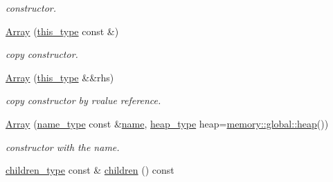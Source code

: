 \begin{DoxyCompactItemize}
\begin{DoxyCompactList}\small\item\em constructor. \end{DoxyCompactList}\item 
\hypertarget{classhryky_1_1reduction_1_1_array_aeb59dfb859e8cec1dd251bfa249c42dc}{\hyperlink{classhryky_1_1reduction_1_1_array_aeb59dfb859e8cec1dd251bfa249c42dc}{Array} (\hyperlink{classhryky_1_1reduction_1_1_array_a7d7a0bf446afa38277eab993671ccc83}{this\-\_\-type} const \&)}\label{classhryky_1_1reduction_1_1_array_aeb59dfb859e8cec1dd251bfa249c42dc}

\begin{DoxyCompactList}\small\item\em copy constructor. \end{DoxyCompactList}\item 
\hypertarget{classhryky_1_1reduction_1_1_array_ab5a4c3aceb879ef5ffafa451fff834df}{\hyperlink{classhryky_1_1reduction_1_1_array_ab5a4c3aceb879ef5ffafa451fff834df}{Array} (\hyperlink{classhryky_1_1reduction_1_1_array_a7d7a0bf446afa38277eab993671ccc83}{this\-\_\-type} \&\&rhs)}\label{classhryky_1_1reduction_1_1_array_ab5a4c3aceb879ef5ffafa451fff834df}

\begin{DoxyCompactList}\small\item\em copy constructor by rvalue reference. \end{DoxyCompactList}\item 
\hypertarget{classhryky_1_1reduction_1_1_array_a55843af1a1b9c17cc1334e05d5fd0ee9}{\hyperlink{classhryky_1_1reduction_1_1_array_a55843af1a1b9c17cc1334e05d5fd0ee9}{Array} (\hyperlink{namespacehryky_1_1reduction_ac686c30a4c8d196bbd0f05629a6b921f}{name\-\_\-type} const \&\hyperlink{classhryky_1_1reduction_1_1_base_a842569265d741905eb8a353d3935f1d1}{name}, \hyperlink{classhryky_1_1memory_1_1heap_1_1_base}{heap\-\_\-type} heap=\hyperlink{namespacehryky_1_1memory_1_1global_a6fc6103f67c837aa0f39b359588409cd}{memory\-::global\-::heap}())}\label{classhryky_1_1reduction_1_1_array_a55843af1a1b9c17cc1334e05d5fd0ee9}

\begin{DoxyCompactList}\small\item\em constructor with the name. \end{DoxyCompactList}\item 
\hypertarget{classhryky_1_1reduction_1_1_array_aacaeae04bbd9911594394d06773b2799}{\hyperlink{classhryky_1_1_vector}{children\-\_\-type} const \& \hyperlink{classhryky_1_1reduction_1_1_array_aacaeae04bbd9911594394d06773b2799}{children} () const }\label{classhryky_1_1reduction_1_1_array_aacaeae04bbd9911594394d06773b2799}


\end{DoxyCompactItemize}
